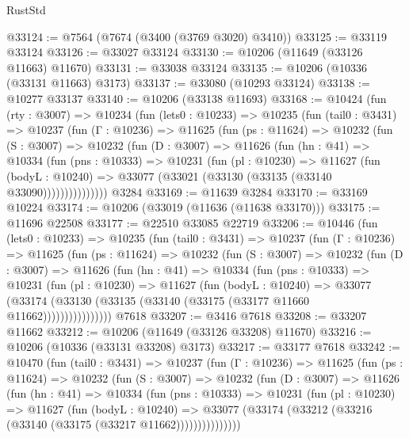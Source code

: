 \begin{lexlean}{RustStd}
\begin{coremodule}
@33124 := @7564 (@7674 (@3400 (@3769 @3020) @3410))
@33125 := @33119 @33124
@33126 := @33027 @33124
@33130 := @10206 (@11649 (@33126 @11663) @11670)
@33131 := @33038 @33124
@33135 := @10206 (@10336 (@33131 @11663) @3173)
@33137 := @33080 (@10293 @33124)
@33138 := @10277 @33137
@33140 := @10206 (@33138 @11693)
@33168 := @10424
    (fun (rty : @3007) =>
    @10234
      (fun (lets0 : @10233) =>
      @10235
        (fun (tail0 : @3431) =>
        @10237
          (fun (Γ : @10236) =>
          @11625
            (fun (ps : @11624) =>
            @10232
              (fun (S : @3007) =>
              @10232
                (fun (D : @3007) =>
                @11626
                  (fun (hn : @41) =>
                  @10334
                    (fun (pns : @10333) =>
                    @10231
                      (fun (pl : @10230) =>
                      @11627
                        (fun (bodyL : @10240) =>
                        @33077 (@33021 (@33130 (@33135 (@33140 @33090)))))))))))))))
    @3284
@33169 := @11639 @3284
@33170 := @33169 @10224
@33174 := @10206 (@33019 (@11636 (@11638 @33170)))
@33175 := @11696 @22508
@33177 := @22510 @33085 @22719
@33206 := @10446
    (fun (lets0 : @10233) =>
    @10235
      (fun (tail0 : @3431) =>
      @10237
        (fun (Γ : @10236) =>
        @11625
          (fun (ps : @11624) =>
          @10232
            (fun (S : @3007) =>
            @10232
              (fun (D : @3007) =>
              @11626
                (fun (hn : @41) =>
                @10334
                  (fun (pns : @10333) =>
                  @10231
                    (fun (pl : @10230) =>
                    @11627
                      (fun (bodyL : @10240) =>
                      @33077
                        (@33174
                          (@33130 (@33135 (@33140 (@33175 (@33177 @11660 @11662))))))))))))))))
    @7618
@33207 := @3416 @7618
@33208 := @33207 @11662
@33212 := @10206 (@11649 (@33126 @33208) @11670)
@33216 := @10206 (@10336 (@33131 @33208) @3173)
@33217 := @33177 @7618
@33242 := @10470
    (fun (tail0 : @3431) =>
    @10237
      (fun (Γ : @10236) =>
      @11625
        (fun (ps : @11624) =>
        @10232
          (fun (S : @3007) =>
          @10232
            (fun (D : @3007) =>
            @11626
              (fun (hn : @41) =>
              @10334
                (fun (pns : @10333) =>
                @10231
                  (fun (pl : @10230) =>
                  @11627
                    (fun (bodyL : @10240) =>
                    @33077 (@33174 (@33212 (@33216 (@33140 (@33175 (@33217 @11662)))))))))))))))

\end{coremodule}
\end{lexlean}
